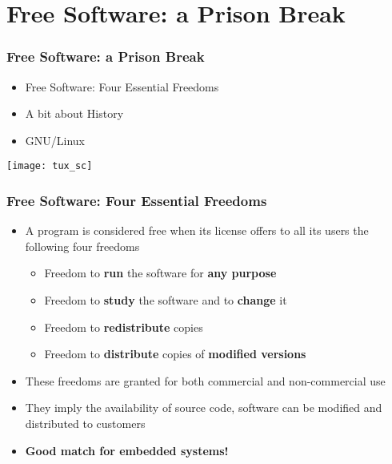 \section{Free Software: a Prison Break}

\begin{frame}
  \frametitle{Free Software: a Prison Break}

  \begin{itemize}
    \item Free Software: Four Essential Freedoms
    \item A bit about History
    \item GNU/Linux
  \end{itemize}
  
  \centering
  \texttt{[image: tux\_sc]}
  
\end{frame}




\begin{frame}
  \frametitle{Free Software: Four Essential Freedoms}

  \begin{itemize}
    \item
         A program is considered free when its license offers to all its
users the following four freedoms
\begin{itemize}
    \item 
Freedom to \textbf{run} the software for \textbf{any purpose}
\item Freedom to \textbf{study} the software and to \textbf{change} it
\item Freedom to \textbf{redistribute} copies
\item Freedom to \textbf{distribute} copies of \textbf{modified versions}
\end{itemize}
\item These freedoms are granted for both commercial and
non-commercial use
\item They imply the availability of source code, software can be
modified and distributed to customers
\item \textbf{Good match for embedded systems!}
  \end{itemize}
  
\end{frame}



